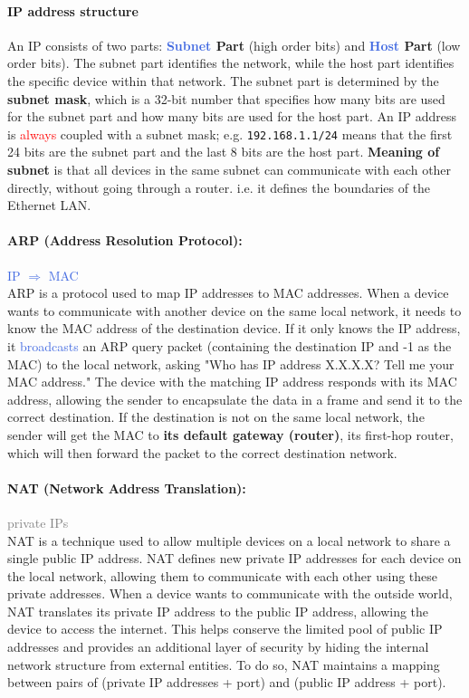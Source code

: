 \documentclass[openany,12pt]{book}
\newcommand{\code}[1]{\texttt{#1}}
\newcommand{\red}[1]{\textcolor{Red}{#1}}
\newcommand{\blue}[1]{\textcolor{RoyalBlue}{#1}}
\newcommand{\gray}[1]{\textcolor{gray}{#1}}
\begin{document}
\paragraph{IP address structure} An IP consists of two parts: \textbf{\blue{Subnet} Part} (high order bits) and \textbf{\blue{Host} Part} (low order bits). The subnet part identifies the network, while the host part identifies the specific device within that network. The subnet part is determined by the \textbf{subnet mask}, which is a 32-bit number that specifies how many bits are used for the subnet part and how many bits are used for the host part. An IP address is \red{always} coupled with a subnet mask; e.g. \code{192.168.1.1/24} means that the first 24 bits are the subnet part and the last 8 bits are the host part. \textbf{Meaning of subnet} is that all devices in the same subnet can communicate with each other directly, without going through a router. i.e. it defines the boundaries of the Ethernet LAN.


\paragraph{ARP (Address Resolution Protocol):} \blue{IP \(\Longrightarrow\) MAC} \\
ARP is a protocol used to map IP addresses to MAC addresses. When a device wants to communicate with another device on the same local network, it needs to know the MAC address of the destination device. If it only knows the IP address, it \blue{broadcasts} an ARP query packet (containing the destination IP and -1 as the MAC) to the local network, asking "Who has IP address X.X.X.X? Tell me your MAC address." The device with the matching IP address responds with its MAC address, allowing the sender to encapsulate the data in a frame and send it to the correct destination. If the destination is not on the same local network, the sender will get the MAC to \textbf{its default gateway (router)}, its first-hop router, which will then forward the packet to the correct destination network.

\paragraph{NAT (Network Address Translation):} \gray{private IPs} \\
NAT is a technique used to allow multiple devices on a local network to share a single public IP address. NAT defines new private IP addresses for each device on the local network, allowing them to communicate with each other using these private addresses. When a device wants to communicate with the outside world, NAT translates its private IP address to the public IP address, allowing the device to access the internet. This helps conserve the limited pool of public IP addresses and provides an additional layer of security by hiding the internal network structure from external entities. To do so, NAT maintains a mapping between pairs of (private IP addresses + port) and (public IP address + port).
\end{document}
